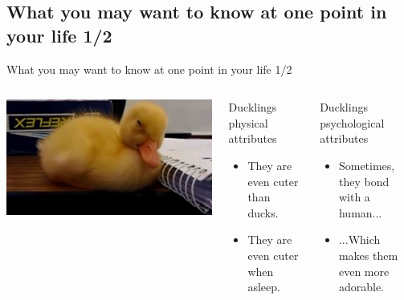 \documentclass[11pt]{beamer}
\begin{document}
\subsection{What you may want to know at one point in your life 1/2}
\begin{frame}{What you may want to know at one point in your life 1/2}
    \begin{columns}[c] %
        \includegraphics[width = .8\textwidth]{sleepyduck.jpg}
        \pause
        \begin{block}{Ducklings physical attributes}
            \begin{itemize}
                \item They are even cuter than ducks.
                \item They are even cuter when asleep.
            \end{itemize}
        \end{block}
		\pause
        \begin{block}{Ducklings psychological attributes}
            \begin{itemize}
                \item Sometimes, they bond with a human...
                \item ...Which makes them even more adorable.
            \end{itemize}
        \end{block}
    \end{columns}
\end{frame}
\end{document}
